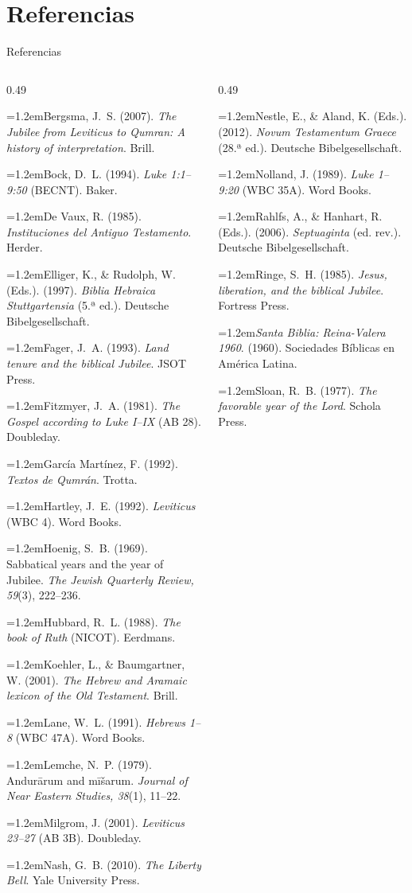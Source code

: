 \documentclass[hyperref={bookmarks=false},aspectratio=169]{beamer}
\newcommand{\refapa}[1]{\par{\RaggedRight\hangindent=1.2em\hangafter=1\noindent #1\par}\vspace{3pt}}
\begin{document}
\section{Referencias}

\begin{frame}{Referencias}
\fontsize{4.6}{5.5}\selectfont
\begin{columns}[t,onlytextwidth]
\begin{column}{0.49\textwidth}
\refapa{Bergsma, J.~S. (2007). \emph{The Jubilee from Leviticus to Qumran: A history of interpretation}. Brill.}
\refapa{Bock, D.~L. (1994). \emph{Luke 1:1--9:50} (BECNT). Baker.}
\refapa{De Vaux, R. (1985). \emph{Instituciones del Antiguo Testamento}. Herder.}
\refapa{Elliger, K., \& Rudolph, W. (Eds.). (1997). \emph{Biblia Hebraica Stuttgartensia} (5.ª ed.). Deutsche Bibelgesellschaft.}
\refapa{Fager, J.~A. (1993). \emph{Land tenure and the biblical Jubilee}. JSOT Press.}
\refapa{Fitzmyer, J.~A. (1981). \emph{The Gospel according to Luke I--IX} (AB 28). Doubleday.}
\refapa{García Martínez, F. (1992). \emph{Textos de Qumrán}. Trotta.}
\refapa{Hartley, J.~E. (1992). \emph{Leviticus} (WBC 4). Word Books.}
\refapa{Hoenig, S.~B. (1969). Sabbatical years and the year of Jubilee. \emph{The Jewish Quarterly Review, 59}(3), 222--236.}
\refapa{Hubbard, R.~L. (1988). \emph{The book of Ruth} (NICOT). Eerdmans.}
\refapa{Koehler, L., \& Baumgartner, W. (2001). \emph{The Hebrew and Aramaic lexicon of the Old Testament}. Brill.}
\refapa{Lane, W.~L. (1991). \emph{Hebrews 1--8} (WBC 47A). Word Books.}
\refapa{Lemche, N.~P. (1979). Andurārum and mīšarum. \emph{Journal of Near Eastern Studies, 38}(1), 11--22.}
\refapa{Milgrom, J. (2001). \emph{Leviticus 23--27} (AB 3B). Doubleday.}
\refapa{Nash, G.~B. (2010). \emph{The Liberty Bell}. Yale University Press.}
\end{column}
\begin{column}{0.49\textwidth}
\refapa{Nestle, E., \& Aland, K. (Eds.). (2012). \emph{Novum Testamentum Graece} (28.ª ed.). Deutsche Bibelgesellschaft.}
\refapa{Nolland, J. (1989). \emph{Luke 1--9:20} (WBC 35A). Word Books.}
\refapa{Rahlfs, A., \& Hanhart, R. (Eds.). (2006). \emph{Septuaginta} (ed. rev.). Deutsche Bibelgesellschaft.}
\refapa{Ringe, S.~H. (1985). \emph{Jesus, liberation, and the biblical Jubilee}. Fortress Press.}
\refapa{\emph{Santa Biblia: Reina-Valera 1960}. (1960). Sociedades Bíblicas en América Latina.}
\refapa{Sloan, R.~B. (1977). \emph{The favorable year of the Lord}. Schola Press.}

\end{column}
\end{columns}
\end{frame}
\end{document}

